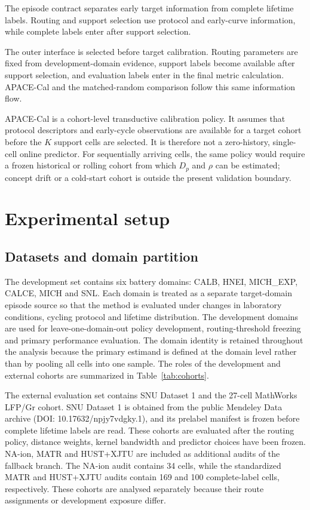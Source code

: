 \documentclass[preprint,12pt]{elsarticle}
\begin{document}
The episode contract separates early target information from complete lifetime labels. Routing and support selection use protocol and early-curve information, while complete labels enter after support selection.

The outer interface is selected before target calibration. Routing parameters are fixed from development-domain evidence, support labels become available after support selection, and evaluation labels enter in the final metric calculation. APACE-Cal and the matched-random comparison follow this same information flow.

APACE-Cal is a cohort-level transductive calibration policy. It assumes that protocol descriptors and early-cycle observations are available for a target cohort before the $K$ support cells are selected. It is therefore not a zero-history, single-cell online predictor. For sequentially arriving cells, the same policy would require a frozen historical or rolling cohort from which $D_p$ and $\rho$ can be estimated; concept drift or a cold-start cohort is outside the present validation boundary.

\section{Experimental setup}
\label{sec:experiments}

\subsection{Datasets and domain partition}

The development set contains six battery domains: CALB, HNEI, MICH\allowbreak\_EXP, CALCE, MICH and SNL. Each domain is treated as a separate target-domain episode source so that the method is evaluated under changes in laboratory conditions, cycling protocol and lifetime distribution. The development domains are used for leave-one-domain-out policy development, routing-threshold freezing and primary performance evaluation. The domain identity is retained throughout the analysis because the primary estimand is defined at the domain level rather than by pooling all cells into one sample. The roles of the development and external cohorts are summarized in Table~\ref{tab:cohorts}.

The external evaluation set contains SNU Dataset 1 and the 27-cell MathWorks LFP/Gr cohort. SNU Dataset 1 is obtained from the public Mendeley Data archive (DOI: 10.17632/npjy7vdgky.1), and its prelabel manifest is frozen before complete lifetime labels are read. These cohorts are evaluated after the routing policy, distance weights, kernel bandwidth and predictor choices have been frozen. NA-ion, MATR and HUST+XJTU are included as additional audits of the fallback branch. The NA-ion audit contains 34 cells, while the standardized MATR and HUST+XJTU audits contain 169 and 100 complete-label cells, respectively. These cohorts are analysed separately because their route assignments or development exposure differ.
\end{document}
